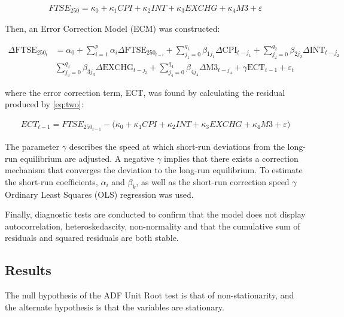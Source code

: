 \documentclass[11pt,a4paper]{article}
\begin{document}
\begin{align}
    FTSE_{250} = \kappa_0 + \kappa_1 CPI + \kappa_2 INT + \kappa_3 EXCHG + \kappa_4 M3 + \varepsilon \label{eq:two}
\end{align}

Then, an Error Correction Model (ECM) was constructed:

\begin{align*}
    \Delta \text{FTSE}_{250_t} &= \alpha_0 + \sum_{i=1}^{p} \alpha_i \Delta \text{FTSE}_{250_{t-i}} + \sum_{j_{1}=0}^{q_1} \beta_{1j_{1}} \Delta \text{CPI}_{t-j_{1}} + \sum_{j_{2}=0}^{q_2} \beta_{2j_{2}} \Delta \text{INT}_{t-j_{2}} \\
                               & \sum_{j_{3}=0}^{q_3} \beta_{3j_{3}} \Delta \text{EXCHG}_{t-j_{3}} + \sum_{j_{4}=0}^{q_4} \beta_{4j_{4}} \Delta \text{M3}_{t-j_{4}} + \gamma\text{ECT}_{t-1} + \varepsilon_t
\end{align*}

where the error correction term, ECT, was found by calculating the residual 
produced by \eqref{eq:two}:

\begin{align*}
    ECT_{t-1} = FTSE_{250_{t-1}} - \biggl(\kappa_0 + \kappa_1 CPI + \kappa_2 INT + \kappa_3 EXCHG + \kappa_4 M3 + \varepsilon \biggr)
\end{align*}

The parameter $\gamma$ describes the speed at which short-run deviations from the long-run equilibrium
are adjusted. A negative $\gamma$ implies that there exists a correction mechanism that converges the deviation 
to the long-run equilibrium. To estimate the short-run coefficients, $\alpha_i$ and $\beta_k$, as 
well as the short-run correction speed $\gamma$ Ordinary Least Squares (OLS) regression was used.

Finally, diagnostic tests are conducted to confirm that the model does not
display autocorrelation, heteroskedascity, non-normality and that the cumulative 
sum of residuals and squared residuals are both stable.

\subsection{Results}

The null hypothesis of the ADF Unit Root test is that of non-stationarity, and the alternate hypothesis 
is that the variables are stationary.
\end{document}
